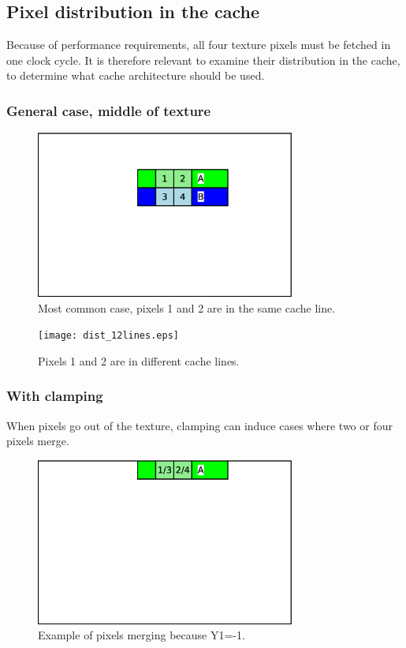 \documentclass[a4paper,11pt]{article}
\begin{document}
\subsection{Pixel distribution in the cache}
Because of performance requirements, all four texture pixels must be fetched in one clock cycle. It is therefore relevant to examine their distribution in the cache, to determine what cache architecture should be used.

\subsubsection{General case, middle of texture}
\begin{figure}[H]
\centering
\includegraphics[height=55mm]{dist_common.eps}
\caption{Most common case, pixels 1 and 2 are in the same cache line.}\label{fig:case1}
\end{figure}

\begin{figure}[H]
\centering
\texttt{[image: dist\_12lines.eps]}
\caption{Pixels 1 and 2 are in different cache lines.}\label{fig:case2}
\end{figure}

\subsubsection{With clamping}
When pixels go out of the texture, clamping can induce cases where two or four pixels merge.

\begin{figure}[H]
\centering
\includegraphics[height=55mm]{dist_clamp.eps}
\caption{Example of pixels merging because Y1=-1.}\label{fig:caseclamp}
\end{figure}
\end{document}
